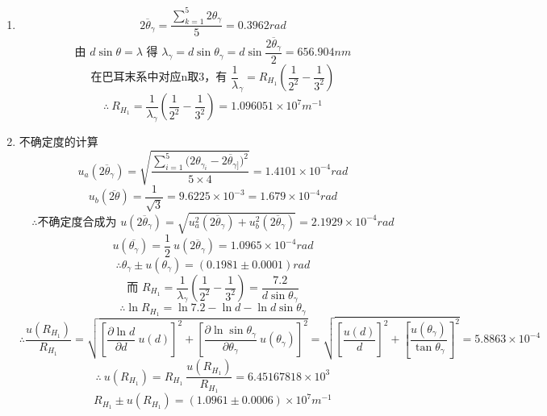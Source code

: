 \documentclass[11pt,a4paper,oneside]{article}
\begin{document}
\begin{enumerate}
  \item { }
      $$\overline{2{\theta}_{\gamma}} = \displaystyle\frac{\sum_{k=1}^5 2{\theta}_{\gamma}}{5} = 0.3962rad$$
      $$\displaystyle\text{由\ }d\sin{\theta} = {\lambda}\text{\ 得\ }{\lambda}_{\gamma} = d\sin{\theta}_{\gamma} = d\sin{\frac{\overline{2{\theta}_{\gamma}}}{2}} = 656.904 nm $$
      $$\displaystyle\text{在巴耳末系中对应n取3，有\ }\frac{1}{\lambda}_{\gamma} = R_{H_1}\left(\frac{1}{2^2}-\frac{1}{3^2}\right)$$
      $$\therefore\ \displaystyle R_{H_{1}} = \frac{1}{ {\lambda}_{\gamma}}\left(\frac{1}{2^2}-\frac{1}{3^2}\right) = 1.096051{\times}10^{7}m^{-1}$$
  \item {不确定度的计算}
      $$u_a(\overline{2{\theta}_{\gamma}}) = \displaystyle\sqrt{\frac{\sum_{i=1}^{5} {(2{\theta}_{ {\gamma}_{i}}-\overline{2{\theta}_{\gamma]}}})^2}{5\times4}}=1.4101{\times}10^{-4}rad$$
      $$u_b(\overline{2\theta}) = \displaystyle\frac{1}{\sqrt3} = 9.6225\times10^{-3} = 1.679 \times 10^{-4} rad$$
      $$\therefore\text{不确定度合成为\ }u(\overline{2{\theta}_{\gamma}}) = \sqrt{u_a^2(\overline{2{\theta}_{\gamma}})+u_b^2(\overline{2{\theta}_{\gamma}})} = 2.1929{\times}10^{-4}rad$$
      $$u(\overline{ {\theta}_{\gamma}})= \displaystyle\frac12\ u(\overline{2{\theta}_{\gamma}}) = 1.0965{\times}10^{-4}rad$$
      $$\therefore{\theta}_{\gamma} \pm u({\theta}_{\gamma}) = (0.1981\pm0.0001)rad$$
      $$\text{而\ }\displaystyle R_{H_1} = \frac{1}{ {\lambda}_{\gamma}}\left(\frac{1}{2^2}-\frac{1}{3^2}\right) = \frac{7.2}{d\sin{\theta}_{\gamma}}$$
      $$\therefore\ln{R_{H_1}} = \ln{7.2} -\ln{d} - \ln{d\sin{\theta}_{\gamma}}$$
      $$\therefore\displaystyle \frac{u(R_{H_1})}{R_{H_1}} = \sqrt{ {\left[\frac{\partial{\ln{d}}}{\partial{d}}\ u(d)\right]}^2 + {\left[\frac{\partial{\ln{\sin{ {\theta}_{\gamma}}}}}{\partial{ {\theta}_{\gamma}}}\ u({\theta}_{\gamma})\right]}^2} = \sqrt{  {\left[\frac{u(d)}{d}\right]}^2 + {\left[\frac{u({\theta}_{\gamma})}{\tan{ {\theta}_{\gamma}}}\right]}^2} = 5.8863{\times}10^{-4}$$
      $$\therefore \ u(R_{H_1}) = \displaystyle R_{H_1}\ \frac{u(R_{H_1})}{R_{H_1}} = 6.45167818{\times}10^{3}$$ 
      $$R_{H_1} \pm u(R_{H_1}) = (1.0961\pm0.0006){\times}10^{7}m^{-1}$$
\end{enumerate}
\end{document}
